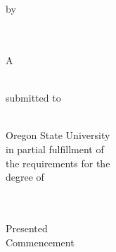 {
\vspace{12mm}
\begin{center}\baselineskip 14.5pt
\mytitle\\\strut\\
by\strut\\
\myname\\
\vskip 25mm
A \mythesis\\\strut\\
submitted to\\\strut\\
Oregon State University\\
\vskip 25mm
in partial fulfillment of\\
the requirements for the\\
degree of\\\strut\\
\mydegree\\
\vskip 25mm
Presented \myday\\
Commencement \mycommonth \hspace{2pt} \mycomyear\\
\end{center}
%
}

 


